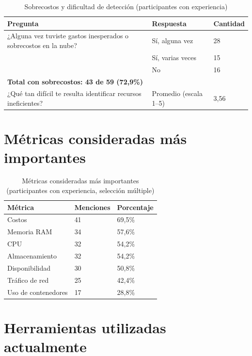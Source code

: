 \documentclass[a4paper, 12pt, oneside, openany]{book}
\begin{document}
\begin{table}[H]
\centering
\scriptsize
\caption{Sobrecostos y dificultad de detección (participantes con experiencia)}
\label{tab:enc-problematica}
\begin{tabular}{|p{8cm}|p{2.5cm}|p{2cm}|}
\hline
\textbf{Pregunta} & \textbf{Respuesta} & \textbf{Cantidad} \\
\hline
¿Alguna vez tuviste gastos inesperados o sobrecostos en la nube? & Sí, alguna vez & 28 \\
& Sí, varias veces & 15 \\
& No & 16 \\
\hline
\multicolumn{3}{|l|}{\textbf{Total con sobrecostos: 43 de 59 (72,9\%)}} \\
\hline
¿Qué tan difícil te resulta identificar recursos ineficientes? & Promedio (escala 1--5) & 3,56 \\
\hline
\end{tabular}
\end{table}

\section{Métricas consideradas más importantes}

\begin{table}[H]
\centering
\scriptsize
\caption{Métricas consideradas más importantes (participantes con experiencia, selección múltiple)}
\label{tab:enc-metricas}
\begin{tabular}{|p{6cm}|p{2cm}|p{3cm}|}
\hline
\textbf{Métrica} & \textbf{Menciones} & \textbf{Porcentaje} \\
\hline
Costos & 41 & 69,5\% \\
Memoria RAM & 34 & 57,6\% \\
CPU & 32 & 54,2\% \\
Almacenamiento & 32 & 54,2\% \\
Disponibilidad & 30 & 50,8\% \\
Tráfico de red & 25 & 42,4\% \\
Uso de contenedores & 17 & 28,8\% \\
\hline
\end{tabular}
\end{table}

\section{Herramientas utilizadas actualmente}
\end{document}
